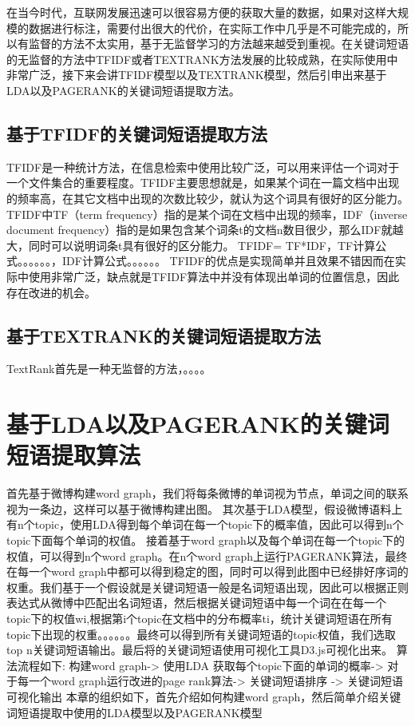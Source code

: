 \documentclass[master]{njuthesis}
\begin{document}
    在当今时代，互联网发展迅速可以很容易方便的获取大量的数据，如果对这样大规模的数据进行标注，需要付出很大的代价，在实际工作中几乎是不可能完成的，所以有监督的方法不太实用，基于无监督学习的方法越来越受到重视。在关键词短语的无监督的方法中TFIDF或者TEXTRANK方法发展的比较成熟，在实际使用中非常广泛，接下来会讲TFIDF模型以及TEXTRANK模型，然后引申出来基于LDA以及PAGERANK的关键词短语提取方法。

\subsection{基于TFIDF的关键词短语提取方法}

    TFIDF是一种统计方法，在信息检索中使用比较广泛，可以用来评估一个词对于一个文件集合的重要程度。TFIDF主要思想就是，如果某个词在一篇文档中出现的频率高，在其它文档中出现的次数比较少，就认为这个词具有很好的区分能力。TFIDF中TF（term frequency）指的是某个词在文档中出现的频率，IDF（inverse document frequency）指的是如果包含某个词条t的文档n数目很少，那么IDF就越大，同时可以说明词条t具有很好的区分能力。
    TFIDF= TF*IDF，TF计算公式。。。。。。，IDF计算公式。。。。。。
    TFIDF的优点是实现简单并且效果不错因而在实际中使用非常广泛，缺点就是TFIDF算法中并没有体现出单词的位置信息，因此存在改进的机会。

\subsection{基于TEXTRANK的关键词短语提取方法}

    TextRank首先是一种无监督的方法，。。。。

\section{基于LDA以及PAGERANK的关键词短语提取算法}

    首先基于微博构建word graph，我们将每条微博的单词视为节点，单词之间的联系视为一条边，这样可以基于微博构建出图。
    其次基于LDA模型，假设微博语料上有n个topic，使用LDA得到每个单词在每一个topic下的概率值，因此可以得到n个topic下面每个单词的权值。
    接着基于word graph以及每个单词在每一个topic下的权值，可以得到n个word graph。在n个word graph上运行PAGERANK算法，最终在每一个word graph中都可以得到稳定的图，同时可以得到此图中已经排好序词的权重。我们基于一个假设就是关键词短语一般是名词短语出现，因此可以根据正则表达式从微博中匹配出名词短语，然后根据关键词短语中每一个词在在每一个topic下的权值wi,根据第i个topic在文档中的分布概率ti，统计关键词短语在所有topic下出现的权重。。。。。。最终可以得到所有关键词短语的topic权值，我们选取top n关键词短语输出。最后将的关键词短语使用可视化工具D3.js可视化出来。
    算法流程如下:
    构建word graph-> 使用LDA 获取每个topic下面的单词的概率-> 对于每一个word graph运行改进的page rank算法-> 关键词短语排序 -> 关键词短语可视化输出
    本章的组织如下，首先介绍如何构建word graph，然后简单介绍关键词短语提取中使用的LDA模型以及PAGERANK模型
\end{document}
